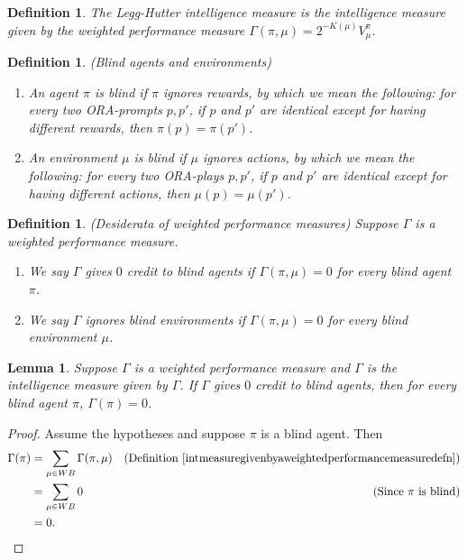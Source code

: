 \documentclass{article}
\newtheorem{definition}[theorem]{Definition}
\newtheorem{lemma}[theorem]{Lemma}
\begin{document}
\begin{definition}
\label{intmeasuregivenbyaweightedperformancemeasuredefn}
    The \emph{Legg-Hutter intelligence measure} is the
    intelligence measure given by the weighted performance measure
    $\Gamma(\pi,\mu)=2^{-K(\mu)}V^\pi_\mu$.
\end{definition}

\begin{definition}
(Blind agents and environments)
    \begin{enumerate}
        \item
        An agent $\pi$ is \emph{blind} if $\pi$ ignores rewards,
        by which we mean the following:
        for every two ORA-prompts $p,p'$, if $p$ and $p'$ are identical
        except for having different rewards, then $\pi(p)=\pi(p')$.
        \item
        An environment $\mu$ is \emph{blind} if $\mu$ ignores actions,
        by which we mean the following:
        for every two ORA-plays $p,p'$, if $p$ and $p'$ are identical
        except for having different actions, then $\mu(p)=\mu(p')$.
    \end{enumerate}
\end{definition}

\begin{definition}
(Desiderata of weighted performance measures)
    Suppose $\Gamma$ is a weighted performance measure.
    \begin{enumerate}
        \item We say $\Gamma$ \emph{gives $0$ credit to blind agents}
        if $\Gamma(\pi,\mu)=0$ for every blind agent $\pi$.
        \item We say $\Gamma$ \emph{ignores blind environments}
        if $\Gamma(\pi,\mu)=0$ for every blind environment $\mu$.
    \end{enumerate}
\end{definition}

\begin{lemma}
    Suppose $\Gamma$ is a weighted performance measure and $\Gamma$
    is the intelligence measure given by $\Gamma$. If $\Gamma$ gives
    $0$ credit to blind agents, then for every blind agent $\pi$,
    $\Gamma(\pi)=0$.
\end{lemma}

\begin{proof}
    Assume the hypotheses and suppose $\pi$ is a blind agent.
    Then
    \begin{align*}
        \Gamma(\pi) &= \sum_{\mu\in WB} \Gamma(\pi,\mu)
            &\mbox{(Definition \ref{intmeasuregivenbyaweightedperformancemeasuredefn})}\\
          &= \sum_{\mu\in WB} 0
            &\mbox{(Since $\pi$ is blind)}\\
          &= 0.
    \end{align*}
\end{proof}
\end{document}
